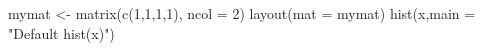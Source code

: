 \begin{Schunk}
\begin{Sinput}
 mymat <- matrix(c(1,1,1,1), ncol = 2)
 layout(mat = mymat)
 hist(x,main = "Default hist(x)")
\end{Sinput}
\end{Schunk}
